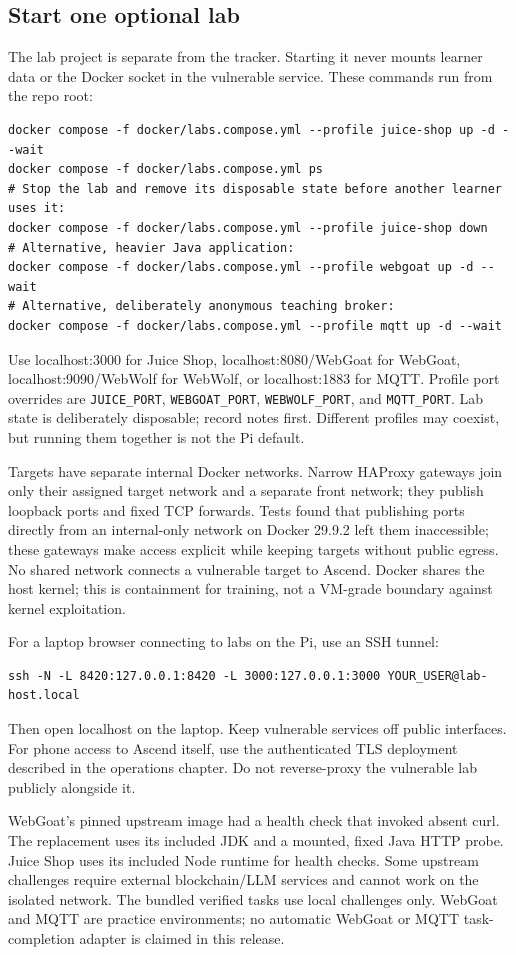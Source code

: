 \subsection{Start one optional lab}
The lab project is separate from the tracker. Starting it never mounts learner data
or the Docker socket in the vulnerable service. These commands run from the repo root:
\begin{verbatim}
docker compose -f docker/labs.compose.yml --profile juice-shop up -d --wait
docker compose -f docker/labs.compose.yml ps
# Stop the lab and remove its disposable state before another learner uses it:
docker compose -f docker/labs.compose.yml --profile juice-shop down
# Alternative, heavier Java application:
docker compose -f docker/labs.compose.yml --profile webgoat up -d --wait
# Alternative, deliberately anonymous teaching broker:
docker compose -f docker/labs.compose.yml --profile mqtt up -d --wait
\end{verbatim}
Use localhost:3000 for Juice Shop, localhost:8080/WebGoat for WebGoat,
localhost:9090/WebWolf for WebWolf, or localhost:1883 for MQTT. Profile port overrides
are \texttt{JUICE\_PORT}, \texttt{WEBGOAT\_PORT}, \texttt{WEBWOLF\_PORT}, and
\texttt{MQTT\_PORT}. Lab state is deliberately disposable; record notes first.
Different profiles may coexist, but running them together is not the Pi default.

Targets have separate internal Docker networks. Narrow HAProxy gateways join only
their assigned target network and a separate front network; they publish loopback
ports and fixed TCP forwards. Tests found that publishing ports directly from an
internal-only network on Docker 29.9.2 left them inaccessible; these gateways make
access explicit while keeping targets without public egress. No shared network
connects a vulnerable target to Ascend. Docker shares the host kernel; this is
containment for training, not a VM-grade boundary against kernel exploitation.

For a laptop browser connecting to labs on the Pi, use an SSH tunnel:
\begin{verbatim}
ssh -N -L 8420:127.0.0.1:8420 -L 3000:127.0.0.1:3000 YOUR_USER@lab-host.local
\end{verbatim}
Then open localhost on the laptop. Keep vulnerable services off public interfaces.
For phone access to Ascend itself, use the authenticated TLS deployment described in
the operations chapter. Do not reverse-proxy the vulnerable lab publicly alongside it.

WebGoat's pinned upstream image had a health check that invoked absent curl. The
replacement uses its included JDK and a mounted, fixed Java HTTP probe. Juice Shop
uses its included Node runtime for health checks. Some upstream challenges require
external blockchain/LLM services and cannot work on the isolated network. The bundled
verified tasks use local challenges only. WebGoat and MQTT are practice environments;
no automatic WebGoat or MQTT task-completion adapter is claimed in this release.

